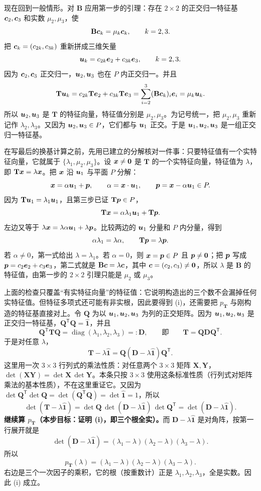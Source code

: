 \documentclass[11pt]{ctexart}
\newcommand{\ten}[1]{\mathbf{#1}}
\newcommand{\unitd}{\hat{\ten{1}}}
\begin{document}
现在回到一般情形。对 $\ten B$ 应用第一步的引理：存在 $2\times2$ 的正交归一特征基 $\boldsymbol{c}_2,\boldsymbol{c}_3$ 和实数 $\mu_2,\mu_3$，使
\[
\ten B\vect c_k=\mu_k\vect c_k,\qquad k=2,3 .
\]
把 $\boldsymbol{c}_k=(c_{2k},c_{3k})$ 重新拼成三维矢量
\[
\boldsymbol{u}_k=c_{2k}\boldsymbol{e}_2+c_{3k}\boldsymbol{e}_3,\qquad k=2,3 .
\]
因为 $\boldsymbol{c}_2,\boldsymbol{c}_3$ 正交归一，$\boldsymbol{u}_2,\boldsymbol{u}_3$ 也在 $P$ 内正交归一。并且
\[
\ten T\vect u_k
=c_{2k}\ten T\vect e_2+c_{3k}\ten T\vect e_3
=\sum_{i=2}^{3}(\ten B\vect c_k)_i\vect e_i
=\mu_k\vect u_k .
\]
所以 $\boldsymbol{u}_2,\boldsymbol{u}_3$ 是 $\ten T$ 的特征向量，特征值分别是 $\mu_2,\mu_3$。为记号统一，把 $\mu_2,\mu_3$ 重新记作 $\lambda_2,\lambda_3$。又因为 $\boldsymbol{u}_2,\boldsymbol{u}_3\in P$，它们都与 $\boldsymbol{u}_1$ 正交。于是 $\boldsymbol{u}_1,\boldsymbol{u}_2,\boldsymbol{u}_3$ 是一组正交归一特征基。

在写最后的换基计算之前，先用已建立的分解核对一件事：只要特征值有一个实特征向量，它就属于 $\{\lambda_1,\mu_2,\mu_3\}$。设 $\boldsymbol{x}\ne\boldsymbol{0}$ 是 $\ten T$ 的一个实特征向量，特征值为 $\lambda$，即 $\ten T\vect x=\lambda\vect x$。把 $\boldsymbol{x}$ 沿 $\boldsymbol{u}_1$ 与平面 $P$ 分解：
\[
\boldsymbol{x}=\alpha\boldsymbol{u}_1+\boldsymbol{p},\qquad
\alpha=\boldsymbol{x}\cdot\boldsymbol{u}_1,\qquad
\boldsymbol{p}=\boldsymbol{x}-\alpha\boldsymbol{u}_1\in P .
\]
因为 $\ten T\vect u_1=\lambda_1\vect u_1$，且第三步已证 $\ten T\vect p\in P$，
\[
\ten T\vect x=\alpha\lambda_1\vect u_1+\ten T\vect p .
\]
左边又等于 $\lambda\boldsymbol{x}=\lambda\alpha\boldsymbol{u}_1+\lambda\boldsymbol{p}$。比较两边的 $\boldsymbol{u}_1$ 分量和 $P$ 内分量，得到
\[
\alpha\lambda_1=\lambda\alpha,\qquad
\ten T\vect p=\lambda\vect p .
\]
若 $\alpha\ne0$，第一式给出 $\lambda=\lambda_1$。若 $\alpha=0$，则 $\boldsymbol{x}=\boldsymbol{p}\in P$ 且 $\boldsymbol{p}\ne\boldsymbol{0}$；把 $\boldsymbol{p}$ 写成 $\boldsymbol{p}=c_2\boldsymbol{e}_2+c_3\boldsymbol{e}_3$，第二式就是 $\ten B\vect c=\lambda\vect c$，其中 $\boldsymbol{c}=(c_2,c_3)\ne\boldsymbol{0}$，所以 $\lambda$ 是 $\ten B$ 的特征值，由第一步的 $2\times2$ 引理只能是 $\mu_2$ 或 $\mu_3$。

上面的检查只覆盖“有实特征向量”的特征值：它说明构造出的三个数不会漏掉任何实特征值。但特征多项式还可能有非实根，因此要得到 (i)，还需要把 $p_{\ten T}$ 与刚构造的特征基直接对上。令 $\ten Q$ 为以 $\boldsymbol{u}_1,\boldsymbol{u}_2,\boldsymbol{u}_3$ 为列的正交矩阵。因为 $\boldsymbol{u}_1,\boldsymbol{u}_2,\boldsymbol{u}_3$ 是正交归一特征基，$\ten Q^{\mathsf T}\ten Q=\unitd$，并且
\[
\ten Q^{\mathsf T}\ten T\ten Q
=\operatorname{diag}(\lambda_1,\lambda_2,\lambda_3)=:\ten D,
\qquad\text{即}\qquad
\ten T=\ten Q\ten D\ten Q^{\mathsf T}.
\]
于是对任意 $\lambda$，
\[
\ten T-\lambda\unitd=\ten Q(\ten D-\lambda\unitd)\ten Q^{\mathsf T}.
\]
这里用一次 $3\times3$ 行列式的乘法性质：对任意两个 $3\times3$ 矩阵 $\ten X,\ten Y$，$\det(\ten X\ten Y)=\det\ten X\,\det\ten Y$。本条只按 $3\times3$ 使用这条标准性质（行列式对矩阵乘法的基本性质），不在这里重证它。又因为 $\det\ten Q^{\mathsf T}\det\ten Q=\det(\ten Q^{\mathsf T}\ten Q)=\det\unitd=1$，所以
\[
\det(\ten T-\lambda\unitd)
=\det\ten Q\,\det(\ten D-\lambda\unitd)\,\det\ten Q^{\mathsf T}
=\det(\ten D-\lambda\unitd).
\]
\textbf{继续算 $p_{\ten T}$（本步目标：证明 (i)，即三个根全实）。}而 $\ten D-\lambda\unitd$ 是对角阵，按第一行展开就是
\[
\det(\ten D-\lambda\unitd)
=(\lambda_1-\lambda)(\lambda_2-\lambda)(\lambda_3-\lambda).
\]
所以
\[
p_{\ten T}(\lambda)=(\lambda_1-\lambda)(\lambda_2-\lambda)(\lambda_3-\lambda).
\]
右边是三个一次因子的乘积，它的根（按重数计）正是 $\lambda_1,\lambda_2,\lambda_3$，全是实数。因此 (i) 成立。
\end{document}
